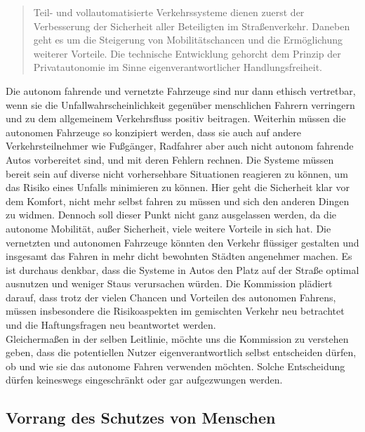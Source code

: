 \documentclass[twoside,a4paper,12pt]{article}
\begin{document}
\begin{quote}
\glqq
Teil- und vollautomatisierte Verkehrssysteme dienen zuerst der Verbesserung der Sicherheit aller Beteiligten im Straßenverkehr. 
Daneben geht es um die Steigerung von Mobilitätschancen und die Ermöglichung weiterer Vorteile. Die technische Entwicklung 
gehorcht dem Prinzip der Privatautonomie im Sinne eigenverantwortlicher Handlungsfreiheit.\grqq\mbox{~\cite[S. 10]{ek}}
\end{quote}
Die autonom fahrende und vernetzte Fahrzeuge sind nur dann ethisch vertretbar,
 wenn sie die Unfallwahrscheinlichkeit gegenüber menschlichen Fahrern verringern und zu dem allgemeinem Verkehrsfluss positiv beitragen.
 Weiterhin müssen die autonomen Fahrzeuge so konzipiert werden, dass sie auch auf andere Verkehrsteilnehmer wie Fußgänger,
 Radfahrer aber auch nicht autonom fahrende Autos  vorbereitet sind, und mit deren Fehlern rechnen. Die Systeme müssen bereit 
 sein auf diverse nicht vorhersehbare Situationen reagieren zu können, um das Risiko eines Unfalls minimieren zu können. Hier 
 geht die Sicherheit klar vor dem Komfort, nicht mehr selbst fahren zu müssen und sich den anderen Dingen zu widmen.
 Dennoch soll dieser Punkt nicht ganz ausgelassen werden, da die autonome Mobilität, außer Sicherheit, viele weitere Vorteile in sich hat.
 Die vernetzten und autonomen Fahrzeuge könnten den Verkehr flüssiger gestalten und insgesamt das Fahren in mehr dicht bewohnten Städten angenehmer machen. 
 Es ist durchaus denkbar, dass die Systeme in Autos den Platz auf der Straße optimal ausnutzen und weniger Staus verursachen würden.
 Die Kommission plädiert darauf, dass trotz der vielen Chancen und Vorteilen des autonomen Fahrens, müssen insbesondere die Risikoaspekten im gemischten Verkehr neu betrachtet
 und die Haftungsfragen neu beantwortet werden. 
 \\  Gleichermaßen in der selben Leitlinie, möchte uns die Kommission zu verstehen geben, dass die potentiellen Nutzer eigenverantwortlich selbst entscheiden dürfen,
 ob und wie sie das autonome Fahren verwenden möchten. Solche Entscheidung dürfen keineswegs eingeschränkt oder gar aufgezwungen werden.

\subsection{Vorrang des Schutzes von Menschen} \label{VorrangDesSchutzesVonMenschen}
\end{document}
